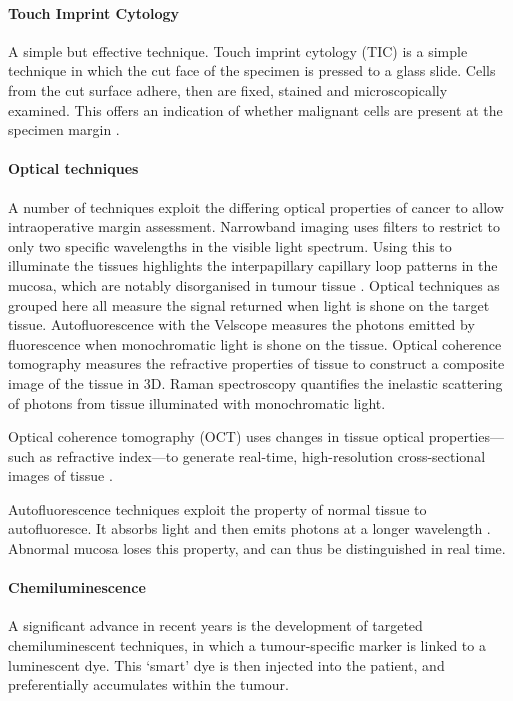 \paragraph{Touch Imprint Cytology}
A simple but effective technique. 
Touch imprint cytology (TIC) is a simple technique in which the cut face of the specimen is pressed to a glass slide. 
Cells from the cut surface adhere, then are fixed, stained and microscopically examined. 
This offers an indication of whether malignant cells are present at the specimen margin \cite{naveedDiagnosticAccuracyTouch2017}.


\paragraph{Optical techniques}
A number of techniques exploit the differing optical properties of cancer to allow intraoperative margin assessment.
Narrowband imaging uses filters to restrict to only two specific wavelengths in the visible light spectrum.
Using this to illuminate the tissues highlights the interpapillary capillary loop patterns in the mucosa, which are notably disorganised in tumour tissue \cite{vuEfficacyNarrowBand2014}.
Optical techniques as grouped here all measure the signal returned when light is shone on the target tissue.
Autofluorescence with the Velscope measures the photons emitted by fluorescence when monochromatic light is shone on the tissue.
Optical coherence tomography measures the refractive properties of tissue to construct a composite image of the tissue in 3D.
Raman spectroscopy quantifies the inelastic scattering of photons from tissue illuminated with monochromatic light.

Optical coherence tomography (OCT) uses changes in tissue optical properties---such as refractive index---to generate real-time, high-resolution cross-sectional images of tissue \cite{heidaria.e.UseOpticalCoherence2020}.

Autofluorescence techniques exploit the property of normal tissue to autofluoresce. 
It absorbs light and then emits photons at a longer wavelength \cite{leey.-j.IntraoperativeFluorescenceGuidedSurgery2020}.
Abnormal mucosa loses this property, and can thus be distinguished in real time.

\paragraph{Chemiluminescence}

A significant advance in recent years is the development of targeted chemiluminescent techniques, in which a tumour-specific marker is linked to a luminescent dye. 
This `smart' dye is then injected into the patient, and preferentially accumulates within the tumour. 

